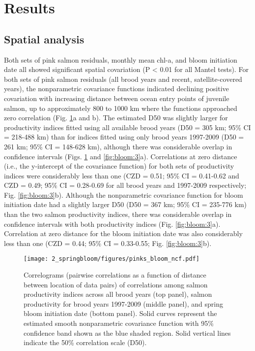 \section{Results}

\subsection{Spatial analysis}

Both sets of pink salmon residuals, monthly mean chl-a, and bloom initiation
date all showed significant spatial covariation (P \textless{} 0.01 for all
Mantel tests). For both sets of pink salmon residuals (all brood years and
recent, satellite-covered years), the nonparametric covariance functions
indicated declining positive covariation with increasing distance between ocean
entry points of juvenile salmon, up to approximately 800 to 1000 km where the
functions approached zero correlation (Fig. \ref{fig:bloom:2}a and b). The
estimated D50 was slightly larger for productivity indices fitted using all
available brood years (D50 = 305 km; 95\% CI = 218-488 km) than for indices
fitted using only brood years 1997-2009 (D50 = 261 km; 95\% CI = 148-628 km),
although there was considerable overlap in confidence intervals (Figs.
\ref{fig:bloom:2} and \ref{fig:bloom:3}a). Correlations at zero distance (i.e.,
the y-intercept of the covariance function) for both sets of productivity
indices were considerably less than one (CZD = 0.51; 95\% CI = 0.41-0.62 and CZD
= 0.49; 95\% CI = 0.28-0.69 for all brood years and 1997-2009 respectively; Fig.
\ref{fig:bloom:3}b). Although the nonparametric covariance function for bloom
initiation date had a slightly larger D50 (D50 = 367 km; 95\% CI = 235-776 km)
than the two salmon productivity indices, there was considerable overlap in
confidence intervals with both productivity indices (Fig. \ref{fig:bloom:3}a).
Correlation at zero distance for the bloom initiation date was also considerably
less than one (CZD = 0.44; 95\% CI = 0.33-0.55; Fig. \ref{fig:bloom:3}b).

\begin{figure}[htbp]
  \centering \texttt{[image: 2\_springbloom/figures/pinks\_bloom\_ncf.pdf]}
  \caption[Correlograms of correlations among salmon productivity
           indices and spring bloom initiation date.]{Correlograms (pairwise
           correlations as a function of distance between location of data
           pairs) of correlations among salmon productivity indices across all
           brood years (top panel), salmon productivity for brood years
           1997-2009 (middle panel), and spring bloom initiation date (bottom
           panel). Solid curves represent the estimated smooth nonparametric
           covariance function with 95\% confidence band shown as the blue
           shaded region. Solid vertical lines indicate the 50\% correlation
           scale (D50).}
  \label{fig:bloom:2}
\end{figure}

